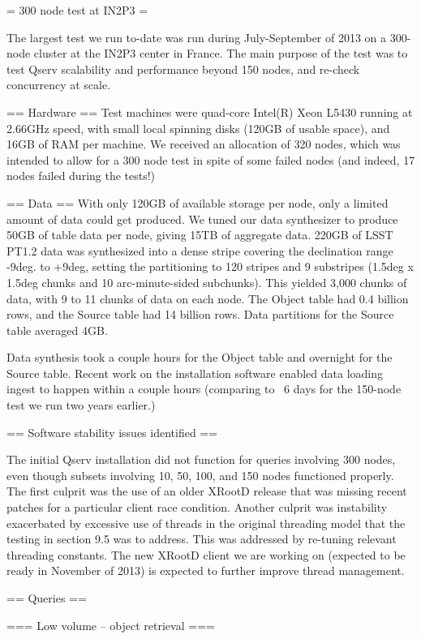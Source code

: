 = 300 node test at IN2P3 =

The largest test we run to-date was run during July-September of 2013 on a 300-node cluster at the IN2P3 center in France. The main purpose of the test was to test Qserv scalability and performance beyond 150 nodes, and re-check concurrency at scale.

== Hardware == 
Test machines were quad-core Intel(R) Xeon L5430 running at 2.66GHz speed, with small local spinning disks (120GB of usable space), and 16GB of RAM per machine. We received an allocation of 320 nodes, which was intended to allow for a 300 node test in spite of some failed nodes (and indeed, 17 nodes failed during the tests!)

==  Data == 
With only 120GB of available storage per node, only a limited amount of data could get produced. We tuned our data synthesizer to produce 50GB of table data per node, giving 15TB of aggregate data. 220GB of LSST PT1.2 data was synthesized into a dense stripe covering the declination range -9deg. to +9deg, setting the partitioning to 120 stripes and 9 substripes (1.5deg x 1.5deg chunks and 10 arc-minute-sided subchunks). This yielded 3,000 chunks of data, with 9 to 11 chunks of data on each node. The Object table had 0.4 billion rows, and the Source table had 14 billion rows. Data partitions for the Source table averaged 4GB.

Data synthesis took a couple hours for the Object table and overnight for the Source table. Recent work on the installation software enabled data loading ingest to happen within a couple hours (comparing to ~6 days for the 150-node test we run two years earlier.)

== Software stability issues identified ==

The initial Qserv installation did not function for queries involving 300 nodes, even though subsets involving 10, 50, 100, and 150 nodes functioned properly. The first culprit was the use of an older XRootD release that was missing recent patches for a particular client race condition. Another culprit was instability exacerbated by excessive use of threads in the original threading model that the testing in section 9.5 was to address. This was addressed by re-tuning relevant threading constants. The new XRootD client we are working on (expected to be ready in November of 2013) is expected to further improve thread management.

== Queries == 

=== Low volume – object retrieval ===

